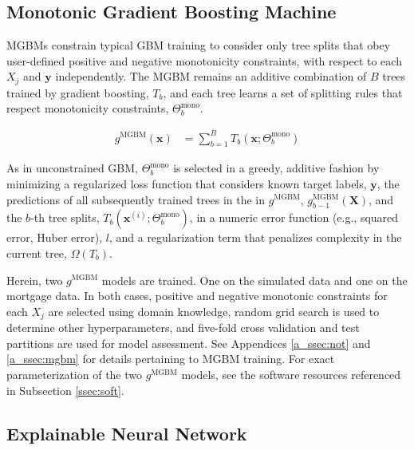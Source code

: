 \documentclass[information,article,submit,moreauthors,pdftex]{definitions/mdpi}
\begin{document}
\subsection{Monotonic Gradient Boosting Machine}\label{ssec:mgbm}

MGBMs constrain typical GBM training to consider only tree splits that obey user-defined positive and negative monotonicity constraints, with respect to each $X_j$ and $\mathbf{y}$ independently. The MGBM remains an additive combination of $B$ trees trained by gradient boosting, $T_b$, and each tree learns a set of splitting rules that respect monotonicity constraints,  $\Theta^\text{mono}_b$. 

\begin{equation}
\begin{aligned}\label{eq:gbm}
g^{\text{MGBM}}(\mathbf{x}) &= \sum_{b=1}^B T_b\left(\mathbf{x}; \Theta^\text{mono}_b\right)
\end{aligned}
\end{equation}

\noindent As in unconstrained GBM, $\Theta^{\text{mono}}_b$ is selected in a greedy, additive fashion by minimizing a regularized loss function that considers known target labels, $\mathbf{y}$, the predictions of all subsequently trained trees in the in $g^{\text{MGBM}}$, $g^{\text{MGBM}}_{b-1}(\mathbf{X})$, and the $b$-th tree splits, $T_b(\mathbf{x}^{(i)};\Theta^\text{mono}_b)$, in a numeric error function (e.g., squared error, Huber error), $l$, and a regularization term that penalizes complexity in the current tree, $\Omega(T_b)$.

Herein, two $g^\text{MGBM}$ models are trained.  One on the simulated data and one on the mortgage data. In both cases, positive and negative monotonic constraints for each $X_j$ are selected using domain knowledge, random grid search is used to determine other hyperparameters, and five-fold cross validation and test partitions are used for model assessment.  See Appendices \ref{a_ssec:not} and \ref{a_ssec:mgbm} for details pertaining to MGBM training. For exact parameterization of the two $g^\text{MGBM}$ models, see the software resources referenced in Subsection \ref{ssec:soft}. 

\subsection{Explainable Neural Network}\label{ssec:xnn}
\end{document}
